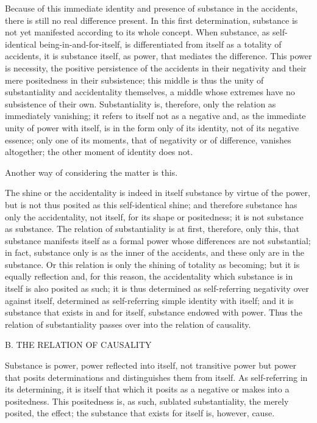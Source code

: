 Because of this immediate identity and presence
of substance in the accidents,
there is still no real difference present.
In this first determination, substance is not yet manifested
according to its whole concept.
When substance, as self-identical being-in-and-for-itself,
is differentiated from itself as a totality of accidents,
it is substance itself, as power, that mediates the difference.
This power is necessity, the positive persistence
of the accidents in their negativity
and their mere positedness in their subsistence;
this middle is thus the unity of
substantiality and accidentality themselves,
a middle whose extremes have no subsistence of their own.
Substantiality is, therefore, only
the relation as immediately vanishing;
it refers to itself not as a negative
and, as the immediate unity of power with itself,
is in the form only of its identity,
not of its negative essence;
only one of its moments,
that of negativity or of difference,
vanishes altogether;
the other moment of identity does not.

Another way of considering the matter is this.

The shine or the accidentality is indeed
in itself substance by virtue of the power,
but is not thus posited as this self-identical shine;
and therefore substance has only the accidentality,
not itself, for its shape or positedness;
it is not substance as substance.
The relation of substantiality is at first, therefore, only this,
that substance manifests itself as a formal power
whose differences are not substantial;
in fact, substance only is as the inner of the accidents,
and these only are in the substance.
Or this relation is only the shining of totality as becoming;
but it is equally reflection and, for this reason,
the accidentality which substance is in itself is also posited as such;
it is thus determined as self-referring negativity over against itself,
determined as self-referring simple identity with itself;
and it is substance that exists in and for itself,
substance endowed with power.
Thus the relation of substantiality passes over
into the relation of causality.

B. THE RELATION OF CAUSALITY

Substance is power, power reflected into itself,
not transitive power but power that posits determinations
and distinguishes them from itself.
As self-referring in its determining,
it is itself that which it posits as a negative
or makes into a positedness.
This positedness is, as such, sublated substantiality,
the merely posited, the effect;
the substance that exists for itself is, however, cause.

